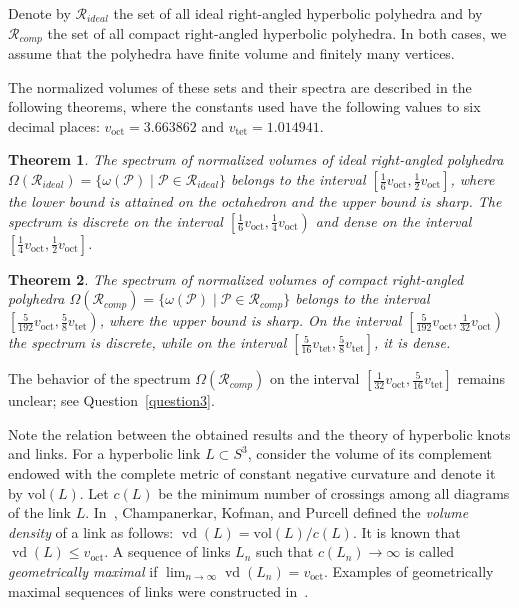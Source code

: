\documentclass{amsart}
\newtheorem{theorem}{Theorem}[section]
\newcommand{\vol}{\mathrm{vol}}
\newcommand{\voct}{v_{\mathrm{oct}}}
\newcommand{\vtet}{v_{\mathrm{tet}}}
\begin{document}
Denote by $\mathcal R_{ideal}$ the set of all ideal right-angled hyperbolic polyhedra and by $\mathcal R_{comp}$ the set of all compact right-angled hyperbolic polyhedra. In both cases, we assume that the polyhedra have finite volume and finitely many vertices.

The normalized volumes of these sets and their spectra are described in the following theorems, where the constants used have the following values to six decimal places: 
$\voct=3.663862$ and $\vtet = 1.014941$. 
	
\begin{theorem} \label{theorem1}
The spectrum of normalized volumes of ideal right-angled polyhedra $\Omega (\mathcal R_{ideal}) = \{\omega(\mathcal P) \mid \mathcal P \in \mathcal{R}_{ideal}\}$ belongs to the interval $\left[ \frac{1}{6} \voct, \frac{1}{2} \voct \right]$, where the lower bound is attained on the octahedron and the upper bound is sharp. The spectrum is discrete on the interval $\left[ \frac{1}{6} \voct, \frac{1}{4} \voct \right)$ and dense on the interval $\left[ \frac{1}{4} \voct, \frac{1}{2} \voct \right]$.
\end{theorem}
	
\begin{theorem} \label{theorem2}
The spectrum of normalized volumes of compact right-angled polyhedra $\Omega (\mathcal R_{comp}) =  \{\omega(\mathcal P) \mid \mathcal P \in \mathcal{R}_{comp}\}$ belongs to the interval $\left[ \frac{5}{192} \voct,  \frac{5}{8} \vtet \right)$, where the upper bound is sharp. On the interval $\left[ \frac{5}{192} \voct, \frac{1}{32} \voct \right)$ the spectrum is discrete, while on the interval $\left[ \frac{5}{16} \vtet, \frac{5}{8} \vtet \right]$, it is dense.
\end{theorem} 
		
The behavior of the spectrum $\Omega (\mathcal R_{comp})$ on the interval $\left[ \frac{1}{32} \voct, \frac{5}{16} \vtet \right]$ remains unclear; see Question~\ref{question3}.		

Note the relation between the obtained results and the theory of hyperbolic knots and links. For a hyperbolic link $L \subset S^3$, consider the volume of its complement endowed with the complete metric of constant negative curvature and denote it by $\vol(L)$. Let $c(L)$ be the minimum number of crossings among all diagrams of the link $L$. In~\cite{CKP2016}, Champanerkar, Kofman, and Purcell defined the \textit{volume density} of a link as follows: $\operatorname{vd} (L) = \vol(L) / c(L)$. It is known that $\operatorname{vd} (L) \leq \voct$. A sequence of links $L_n$ such that $c(L_n) \to \infty$ is called \textit{geometrically maximal} if $\lim_{n\to \infty} \operatorname{vd} (L_n) = \voct$. Examples of geometrically maximal sequences of links were constructed in~\cite{CKP2016}.
\end{document}
